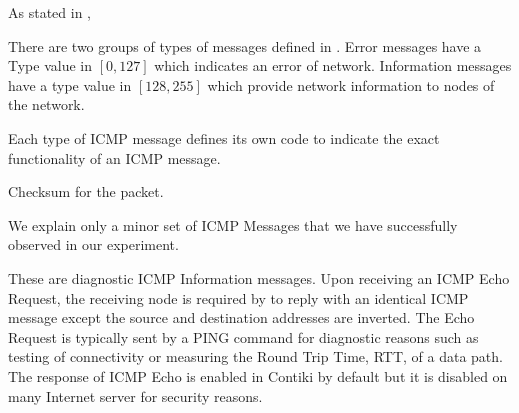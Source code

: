As stated in \cite{rfc4443},
\begin{description}[style=nextline]
\item[\textbf{Type}]
There are two groups of types of messages defined in \cite{rfc4443}. Error messages have a Type value in $[0,127]$ which indicates an error of network. Information messages have a type value in $[128,255]$ which provide network information to nodes of the network.
\item[\textbf{Code}]
Each type of ICMP message defines its own code to indicate the exact functionality of an ICMP message.
\item[\textbf{Checksum}]
Checksum for the packet.
\end{description}

We explain only a minor set of ICMP Messages that we have successfully observed in our experiment.
\begin{description}[style=nextline]
\item[\textbf{Echo Request and Reply Messages}]
These are diagnostic ICMP Information messages. Upon receiving an ICMP Echo Request, the receiving node is required by \cite{rfc4443} to reply with an identical ICMP message except the source and destination addresses are inverted. The Echo Request is typically sent by a PING command for diagnostic reasons such as testing of connectivity or measuring the Round Trip Time, RTT, of a data path. The response of ICMP Echo is enabled in Contiki by default but it is disabled on many Internet server for security reasons.
\end{description}

